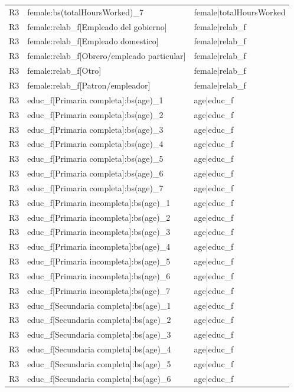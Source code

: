 \begin{longtable}{lll}
R3 & female:bs(totalHoursWorked)\_7 & female|totalHoursWorked \\
R3 & female:relab\_f[Empleado del gobierno] & female|relab\_f \\
R3 & female:relab\_f[Empleado domestico] & female|relab\_f \\
R3 & female:relab\_f[Obrero/empleado particular] & female|relab\_f \\
R3 & female:relab\_f[Otro] & female|relab\_f \\
R3 & female:relab\_f[Patron/empleador] & female|relab\_f \\
R3 & educ\_f[Primaria completa]:bs(age)\_1 & age|educ\_f \\
R3 & educ\_f[Primaria completa]:bs(age)\_2 & age|educ\_f \\
R3 & educ\_f[Primaria completa]:bs(age)\_3 & age|educ\_f \\
R3 & educ\_f[Primaria completa]:bs(age)\_4 & age|educ\_f \\
R3 & educ\_f[Primaria completa]:bs(age)\_5 & age|educ\_f \\
R3 & educ\_f[Primaria completa]:bs(age)\_6 & age|educ\_f \\
R3 & educ\_f[Primaria completa]:bs(age)\_7 & age|educ\_f \\
R3 & educ\_f[Primaria incompleta]:bs(age)\_1 & age|educ\_f \\
R3 & educ\_f[Primaria incompleta]:bs(age)\_2 & age|educ\_f \\
R3 & educ\_f[Primaria incompleta]:bs(age)\_3 & age|educ\_f \\
R3 & educ\_f[Primaria incompleta]:bs(age)\_4 & age|educ\_f \\
R3 & educ\_f[Primaria incompleta]:bs(age)\_5 & age|educ\_f \\
R3 & educ\_f[Primaria incompleta]:bs(age)\_6 & age|educ\_f \\
R3 & educ\_f[Primaria incompleta]:bs(age)\_7 & age|educ\_f \\
R3 & educ\_f[Secundaria completa]:bs(age)\_1 & age|educ\_f \\
R3 & educ\_f[Secundaria completa]:bs(age)\_2 & age|educ\_f \\
R3 & educ\_f[Secundaria completa]:bs(age)\_3 & age|educ\_f \\
R3 & educ\_f[Secundaria completa]:bs(age)\_4 & age|educ\_f \\
R3 & educ\_f[Secundaria completa]:bs(age)\_5 & age|educ\_f \\
R3 & educ\_f[Secundaria completa]:bs(age)\_6 & age|educ\_f \\

\end{longtable}

